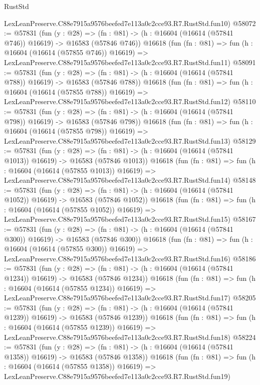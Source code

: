 \begin{lexlean}{RustStd}
\begin{coremodule}
    LexLeanPreserve.C88e7915a9576beefed7e113a0c2cce93.R7.RustStd.fun10)
@58072 := @57831
    (fun (y : @28) =>
    (fn : @81) -> (h : @16604 (@16614 (@57841 @746)) @16619) -> @16583 (@57846 @746))
    @16618
    (fun (fn : @81) =>
    fun (h : @16604 (@16614 (@57855 @746)) @16619) =>
    LexLeanPreserve.C88e7915a9576beefed7e113a0c2cce93.R7.RustStd.fun11)
@58091 := @57831
    (fun (y : @28) =>
    (fn : @81) -> (h : @16604 (@16614 (@57841 @788)) @16619) -> @16583 (@57846 @788))
    @16618
    (fun (fn : @81) =>
    fun (h : @16604 (@16614 (@57855 @788)) @16619) =>
    LexLeanPreserve.C88e7915a9576beefed7e113a0c2cce93.R7.RustStd.fun12)
@58110 := @57831
    (fun (y : @28) =>
    (fn : @81) -> (h : @16604 (@16614 (@57841 @798)) @16619) -> @16583 (@57846 @798))
    @16618
    (fun (fn : @81) =>
    fun (h : @16604 (@16614 (@57855 @798)) @16619) =>
    LexLeanPreserve.C88e7915a9576beefed7e113a0c2cce93.R7.RustStd.fun13)
@58129 := @57831
    (fun (y : @28) =>
    (fn : @81) -> (h : @16604 (@16614 (@57841 @1013)) @16619) -> @16583 (@57846 @1013))
    @16618
    (fun (fn : @81) =>
    fun (h : @16604 (@16614 (@57855 @1013)) @16619) =>
    LexLeanPreserve.C88e7915a9576beefed7e113a0c2cce93.R7.RustStd.fun14)
@58148 := @57831
    (fun (y : @28) =>
    (fn : @81) -> (h : @16604 (@16614 (@57841 @1052)) @16619) -> @16583 (@57846 @1052))
    @16618
    (fun (fn : @81) =>
    fun (h : @16604 (@16614 (@57855 @1052)) @16619) =>
    LexLeanPreserve.C88e7915a9576beefed7e113a0c2cce93.R7.RustStd.fun15)
@58167 := @57831
    (fun (y : @28) =>
    (fn : @81) -> (h : @16604 (@16614 (@57841 @300)) @16619) -> @16583 (@57846 @300))
    @16618
    (fun (fn : @81) =>
    fun (h : @16604 (@16614 (@57855 @300)) @16619) =>
    LexLeanPreserve.C88e7915a9576beefed7e113a0c2cce93.R7.RustStd.fun16)
@58186 := @57831
    (fun (y : @28) =>
    (fn : @81) -> (h : @16604 (@16614 (@57841 @1234)) @16619) -> @16583 (@57846 @1234))
    @16618
    (fun (fn : @81) =>
    fun (h : @16604 (@16614 (@57855 @1234)) @16619) =>
    LexLeanPreserve.C88e7915a9576beefed7e113a0c2cce93.R7.RustStd.fun17)
@58205 := @57831
    (fun (y : @28) =>
    (fn : @81) -> (h : @16604 (@16614 (@57841 @1239)) @16619) -> @16583 (@57846 @1239))
    @16618
    (fun (fn : @81) =>
    fun (h : @16604 (@16614 (@57855 @1239)) @16619) =>
    LexLeanPreserve.C88e7915a9576beefed7e113a0c2cce93.R7.RustStd.fun18)
@58224 := @57831
    (fun (y : @28) =>
    (fn : @81) -> (h : @16604 (@16614 (@57841 @1358)) @16619) -> @16583 (@57846 @1358))
    @16618
    (fun (fn : @81) =>
    fun (h : @16604 (@16614 (@57855 @1358)) @16619) =>
    LexLeanPreserve.C88e7915a9576beefed7e113a0c2cce93.R7.RustStd.fun19)

\end{coremodule}
\end{lexlean}
